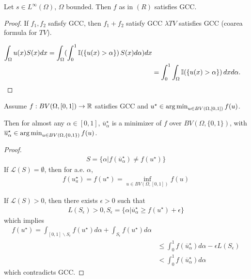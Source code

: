 \begin{proposition}
  Let $s \in L^{\infty}(\Omega)$, $\Omega$ bounded.  Then $f$ as in
  $(R)$ satisfies GCC.
\end{proposition}

\begin{proof}
  If $f_{1}, f_{2}$ safisfy GCC, then $f_{1} + f_{2}$ satisfy GCC
  $\lambda TV$ satisfies GCC (coarea formula for $TV$).

  \begin{align}
    \label{eq:119}
    \int_{\Omega} u(x) S(x) dx = \int_{\Omega} (\int_{0}^{1} \I{\{
      u(x) > \alpha \}} S(x) d\alpha) dx \\
    &= \int_{0}^{1} \int_{\Omega} \I{\{ u(x) > \alpha \}} dx d \alpha.
  \end{align}
\end{proof}

\begin{thm}
  \label{defn:relaxation:4}
  Assume $f: BV(\Omega, [0, 1]) \rightarrow \mathbb{R}$ satisfies GCC and
  $u^{\star} \in \operatorname*{arg\,min}_{u \in BV(\Omega, [0, 1])} f(u)$.

  Then for almost any $\alpha \in [0, 1]$, $\overline
  u^{\star}_{\alpha}$ is a minimizer of $f$ over $BV(\Omega, \{ 0, 1
  \})$, with $\overline u^{\star}_{\alpha} \in \operatorname*{arg\,min}_{u \in
    BV(\Omega, \{ 0, 1 \})} f(u)$.
\end{thm}

\begin{proof}
  \begin{align}
    \label{eq:120}
    S = \{ \alpha | f(\overline u^{\star}_{\alpha}) \neq f(u^{\star}) \}
  \end{align}  If $\mathcal{L}(S) = \emptyset$, then for a.e.
  $\alpha$,
  \begin{align}
    \label{eq:121}
    f(u^{\star}_{a}) = f(u^{\star}) = \inf_{u \in BV(\Omega, [0, 1])} f(u)
  \end{align}

  If $\mathcal{L}(S) > 0$, then there exists $\epsilon > 0$ such that
  \begin{align}
    \label{eq:122}
    L(S_{\epsilon}) > 0, S_{\epsilon} = \{ \alpha | \overline
    u_{\alpha}^{\star} \geq f(u^{\star}) + \epsilon \}
  \end{align} which implies
  \begin{align}
    \label{eq:123}
    f(u^{\star}) = \int_{[0, 1] \backslash S_{\epsilon}} f(u^{\star})
    d\alpha + \int_{S_{\epsilon}} f(u^{\star}) d\alpha  \\
    &\leq \int_{0}^{1} f(\overline u^{\star}_{\alpha}) d\alpha -
    \epsilon L(S_{\epsilon}) \\
    &< \int_{0}^{1} f(\overline u_{\alpha}^{\star}) d \alpha
  \end{align} which contradicts GCC.
\end{proof}

